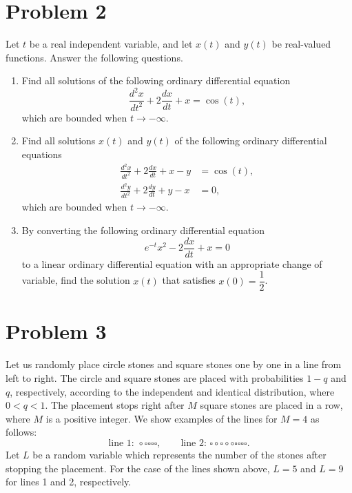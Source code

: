 \documentclass[10pt,a4paper]{article}
\begin{document}
\section*{Problem 2}

Let $t$ be a real independent variable, and let $x(t)$ and $y(t)$ be real-valued functions. Answer the following questions.

\begin{enumerate}
  \item Find all solutions of the following ordinary differential equation
        \[
          \frac{d^2x}{dt^2}+2\frac{dx}{dt}+x=\cos(t),
        \]
        which are bounded when $t\to-\infty$.

  \item Find all solutions $x(t)$ and $y(t)$ of the following ordinary differential equations
        \[
          \begin{aligned}
            \frac{d^2x}{dt^2}+2\frac{dx}{dt}+x-y&=\cos(t),\\
            \frac{d^2y}{dt^2}+2\frac{dy}{dt}+y-x&=0,
          \end{aligned}
        \]
        which are bounded when $t\to-\infty$.

  \item By converting the following ordinary differential equation
        \[
          e^{-t}x^2-2\frac{dx}{dt}+x=0
        \]
        to a linear ordinary differential equation with an appropriate change of variable, find the solution $x(t)$ that satisfies $x(0)=\dfrac12$.
\end{enumerate}

\section*{Problem 3}

Let us randomly place circle stones and square stones one by one in a line from left to right. The circle and square stones are placed with probabilities $1-q$ and $q$, respectively, according to the independent and identical distribution, where $0<q<1$. The placement stops right after $M$ square stones are placed in a row, where $M$ is a positive integer. We show examples of the lines for $M=4$ as follows:
\[
  \text{line 1: }\circ\square\square\square\square,
  \qquad
  \text{line 2: }\square\circ\square\circ\circ\square\square\square\square.
\]
Let $L$ be a random variable which represents the number of the stones after stopping the placement. For the case of the lines shown above, $L=5$ and $L=9$ for lines 1 and 2, respectively.
\end{document}
